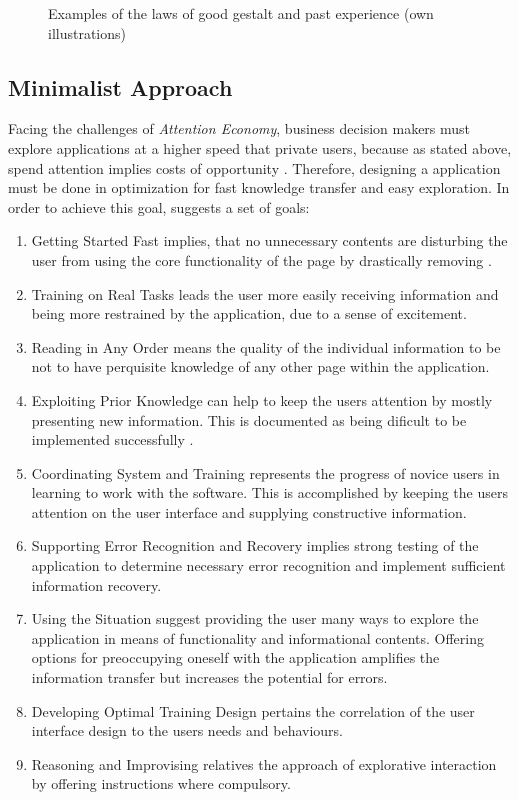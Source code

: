 \begin{enumerate}
\begin{figure}[H]
\begin{minipage}[b]{.5\linewidth}
            \label{fig:exo}
        \end{minipage}
        \caption[Laws of Good Gestalt and Past Experience]{Examples of the laws of good gestalt and past experience (own illustrations)}\label{fig:law4}
    \end{figure}
\end{enumerate}
\subsection{Minimalist Approach}
Facing the challenges of \textit{Attention Economy}, business decision makers must explore applications at a higher speed that private users, because as stated above, spend attention implies costs of opportunity \parencite[cf.][]{Bakar.2017}. Therefore, designing a application must be done in optimization for fast knowledge transfer and easy exploration. In order to achieve this goal, \textcite{Bakar.2017} suggests a set of goals:
\begin{enumerate}
\item{Getting Started Fast} implies, that no unnecessary contents are disturbing the user from using the core functionality of the page by drastically removing   \parencite{Bakar.2017}.
\item{Training on Real Tasks} leads the user more easily receiving information and being more restrained by the application, due to a sense of excitement.
\item{Reading in Any Order} means the quality of the individual information to be not to have perquisite knowledge of any other page within the application.
\item{Exploiting Prior Knowledge} can help to keep the users attention by mostly presenting new information. This is documented as being dificult to be implemented successfully .
\item{Coordinating System and Training} represents the progress of novice users in learning to work with the software. This is accomplished by keeping the users attention on the user interface and supplying constructive information.
\item{Supporting Error Recognition and Recovery} implies strong testing of the application to determine necessary error recognition and implement sufficient information recovery.
\item{Using the Situation} suggest providing the user many ways to explore the application in means of functionality and informational contents. Offering options for preoccupying oneself with the application amplifies the information transfer but increases the potential for errors.
\item{Developing Optimal Training Design} pertains the correlation of the user interface design to the users needs and behaviours. 
\item{Reasoning and Improvising} relatives the approach of explorative interaction by offering instructions where compulsory.
\end{enumerate}
